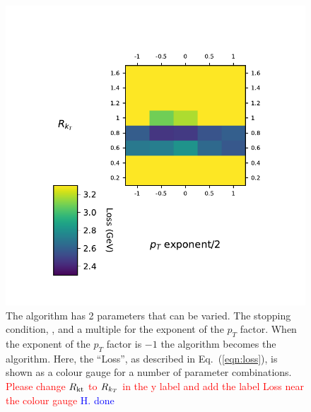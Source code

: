     \begin{figure}[!t]
        \begin{minipage}[c]{0.6\textwidth}
            \includegraphics[width=1\textwidth]{graphics/trangle_scan_genkt}
        \end{minipage}\hfill
        \begin{minipage}[c]{0.35\textwidth}
            \caption{The \genkt{} algorithm has 2 parameters that can be varied.
                The stopping condition, \ktstoppingdeltar{}, and a multiple for the exponent of the \(p_T\) factor.
                When the exponent of the \(p_T\) factor is \(-1\) the algorithm becomes the \antikt{} algorithm.
                Here, the ``Loss'', as described in Eq.~(\ref{eqn:loss}), is shown as a colour gauge for a number of parameter combinations.
                {\textcolor{red}{Please change $R_{\rm kt}$ to \(R{}_{k_T}\) in the y label and add the label Loss near the colour gauge} \textcolor{blue}{H. done}}
             }\label{fig:scan_genkt}
        \end{minipage}
    \end{figure}    

